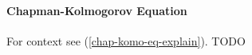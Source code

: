 

\paragraph{Chapman-Kolmogorov Equation} \label{chap-komo-eq-deriv}
For context see (\ref{chap-komo-eq-explain}).
TODO


\begin{equation*} \begin{split}
\end{split} \end{equation*}


